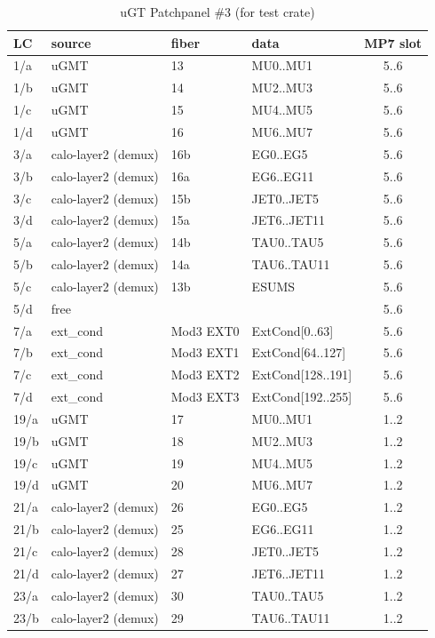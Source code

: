 \begin{longtable}{|l|l|l|l|c|}
\caption{uGT Patchpanel \#3 (for test crate)}
    \label{tab:app:opt_pp_tab_3}\\
\hline
\textbf{LC} & \textbf{source} & \textbf{fiber} & \textbf{data} & \textbf{MP7 slot}\\
\hline
\hline
\endhead
1/a & uGMT & 13 & MU0..MU1 & 5..6\\
1/b & uGMT & 14 & MU2..MU3 & 5..6\\
1/c & uGMT & 15 & MU4..MU5 & 5..6\\
1/d & uGMT & 16 & MU6..MU7 & 5..6\\
3/a & calo-layer2 (demux) & 16b & EG0..EG5 & 5..6\\
3/b & calo-layer2 (demux) & 16a & EG6..EG11 & 5..6\\
3/c & calo-layer2 (demux) & 15b & JET0..JET5 & 5..6\\
3/d & calo-layer2 (demux) & 15a & JET6..JET11 & 5..6\\
5/a & calo-layer2 (demux) & 14b & TAU0..TAU5 & 5..6\\
5/b & calo-layer2 (demux) & 14a & TAU6..TAU11 & 5..6\\
5/c & calo-layer2 (demux) & 13b & ESUMS & 5..6\\
5/d & free &  &  & 5..6\\
7/a & ext\_cond & Mod3 EXT0 & ExtCond[0..63] & 5..6 \\
7/b & ext\_cond & Mod3 EXT1 & ExtCond[64..127] & 5..6\\
7/c & ext\_cond & Mod3 EXT2 & ExtCond[128..191] & 5..6\\
7/d & ext\_cond & Mod3 EXT3 & ExtCond[192..255] & 5..6\\\hline
19/a & uGMT & 17 & MU0..MU1 & 1..2\\
19/b & uGMT & 18 & MU2..MU3 & 1..2\\
19/c & uGMT & 19 & MU4..MU5 & 1..2\\
19/d & uGMT & 20 & MU6..MU7 & 1..2\\
21/a & calo-layer2 (demux) & 26 & EG0..EG5 & 1..2\\
21/b & calo-layer2 (demux) & 25 & EG6..EG11 & 1..2\\
21/c & calo-layer2 (demux) & 28 & JET0..JET5 & 1..2\\
21/d & calo-layer2 (demux) & 27 & JET6..JET11 & 1..2\\
23/a & calo-layer2 (demux) & 30 & TAU0..TAU5 & 1..2\\
23/b & calo-layer2 (demux) & 29 & TAU6..TAU11 & 1..2\\

\end{longtable}
